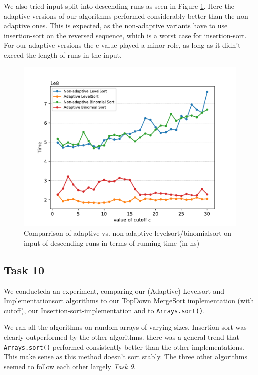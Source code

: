 \documentclass[11pt, a4paper]{article}
\begin{document}
We also tried input split into descending runs as seen in Figure \ref{fig:descRuns}. Here the adaptive versions of our algorithms performed considerably better than the non-adaptive ones. This is expected, as the non-adaptive variants have to use insertion-sort on the reversed sequence, which is a worst case for insertion-sort. For our adaptive versions the c-value played a minor role, as long as it didn't exceed the length of runs in the input.

\begin{figure}[h]
  \begin{center}
    \includegraphics[width=\textwidth]{plot/t9more_runs_time_plot.pdf}
    \caption{Comparrison of adaptive vs. non-adaptive levelsort/binomialsort on input of descending runs in terms of running time (in ns) }
    \label{fig:descRuns}
  \end{center}
\end{figure}


\subsection{Task 10}

We conducteda an experiment, comparing our (Adaptive) Levelsort and Implementationsort algorithms to our TopDown MergeSort implementation (with cutoff), our Insertion-sort-implementation and to \verb|Arrays.sort()|. 

We ran all the algorithms on random arrays of varying sizes.  Insertion-sort was clearly outperformed by the other algorithms. there was a general trend that \verb|Arrays.sort()| performed consistently better than the other implementations. This make sense as this method doesn't sort stably. The three other algorithms seemed to follow each other largely \textit{Task 9}.
\end{document}
